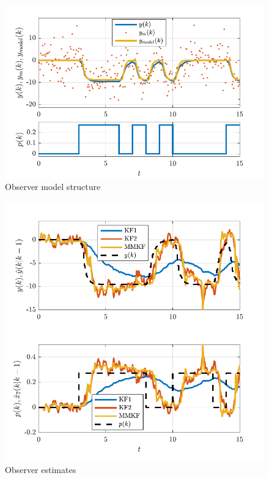 \begin{figure}[htp]
	\centering
	\includegraphics[width=12cm]{images/rod_obs_sim_1_ioplot_P2DcTd4.pdf}
	\caption{Observer model structure}
	\label{fig:rod_obs_sim_1_ioplot_P2DcTd4}
\end{figure}

\begin{figure}[htp]
	\centering
	\includegraphics[width=12cm]{images/rod_obs_sim_1_est_P2DcTd4.pdf}
	\caption{Observer estimates}
	\label{fig:rod_obs_sim_1_est_P2DcTd4}
\end{figure}

